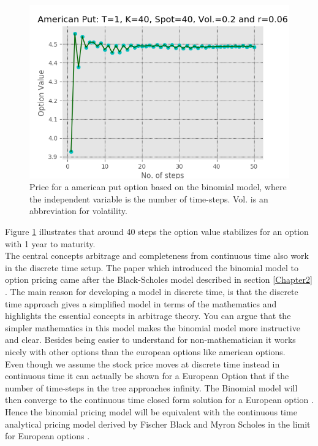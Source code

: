 \begin{figure}[H]
\centering
\includegraphics{Figures/binConv.png}
\decoRule
\caption[Convergence Of Binomial Model]{Price for a american put option based on the binomial model, where the independent variable is the number of time-steps. Vol. is an abbreviation for volatility.}
\label{fig:binConv}
\end{figure}
Figure \ref{fig:binConv} illustrates that around 40 steps the option value stabilizes for an option with 1 year to maturity.\\

The central concepts arbitrage and completeness from continuous time also work in the discrete time setup. The paper \parencite{CRR} which introduced the binomial model to option pricing came after the Black-Scholes model described in section \ref{Chapter2} \parencite{B-S-Paper}. The main reason for developing a model in discrete time, is that the discrete time approach gives a simplified model in terms of the mathematics and highlights the essential concepts in arbitrage theory. You can argue that the simpler mathematics in this model makes the binomial model more instructive and clear. Besides being easier to understand for non-mathematician it works nicely with other options than the european options like american options.\\

Even though we assume the stock price moves at discrete time instead in continuous time it can actually be shown for a European Option that if the number of time-steps in the tree approaches infinity. The Binomial model will then converge to the continuous time closed form solution for a European option \parencite{CRR} \parencite{Hull}. Hence the binomial pricing model will be equivalent with the continuous time analytical pricing model derived by Fischer Black and Myron Scholes in the limit for European options \parencite{CRR}. 


